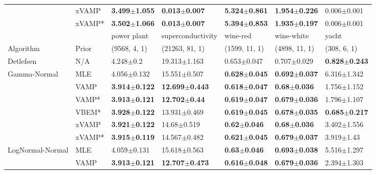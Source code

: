 \begin{tabular}{lllllll}
                 & xVAMP &  \textbf{3.499$\pm$1.055} &  \textbf{0.013$\pm$0.007} &  \textbf{5.324$\pm$0.861} &  \textbf{1.954$\pm$0.226} &         0.006$\pm$0.001 \\
                 & xVAMP* &  \textbf{3.502$\pm$1.066} &  \textbf{0.013$\pm$0.007} &  \textbf{5.394$\pm$0.853} &  \textbf{1.935$\pm$0.197} &         0.006$\pm$0.001 \\
\midrule
                 &        &               power plant &          superconductivity &                  wine-red &                wine-white &                     yacht \\
Algorithm & Prior& (9568, 4, 1)& (21263, 81, 1)& (1599, 11, 1)& (4898, 11, 1)& (308, 6, 1)\\
\midrule
Detlefsen & N/A &             4.248$\pm$0.2 &           19.313$\pm$1.163 &           0.653$\pm$0.047 &           0.707$\pm$0.029 &  \textbf{0.828$\pm$0.243} \\
Gamma-Normal & MLE &           4.056$\pm$0.132 &           15.551$\pm$0.507 &  \textbf{0.628$\pm$0.045} &  \textbf{0.692$\pm$0.037} &           6.316$\pm$1.342 \\
                 & VAMP &  \textbf{3.914$\pm$0.122} &  \textbf{12.699$\pm$0.443} &  \textbf{0.618$\pm$0.047} &   \textbf{0.68$\pm$0.036} &           1.756$\pm$1.152 \\
                 & VAMP* &  \textbf{3.913$\pm$0.121} &   \textbf{12.702$\pm$0.44} &  \textbf{0.619$\pm$0.047} &  \textbf{0.679$\pm$0.036} &           1.796$\pm$1.107 \\
                 & VBEM* &  \textbf{3.928$\pm$0.122} &           13.931$\pm$0.469 &  \textbf{0.619$\pm$0.045} &  \textbf{0.678$\pm$0.035} &  \textbf{0.685$\pm$0.217} \\
                 & xVAMP &  \textbf{3.921$\pm$0.122} &            14.68$\pm$0.519 &   \textbf{0.62$\pm$0.046} &   \textbf{0.68$\pm$0.036} &           3.402$\pm$1.556 \\
                 & xVAMP* &  \textbf{3.915$\pm$0.119} &           14.567$\pm$0.482 &  \textbf{0.621$\pm$0.045} &  \textbf{0.679$\pm$0.037} &            3.919$\pm$1.43 \\
LogNormal-Normal & MLE &           4.059$\pm$0.131 &           15.618$\pm$0.563 &   \textbf{0.63$\pm$0.046} &  \textbf{0.693$\pm$0.038} &           5.516$\pm$1.297 \\
                 & VAMP &  \textbf{3.913$\pm$0.121} &  \textbf{12.707$\pm$0.473} &  \textbf{0.616$\pm$0.048} &  \textbf{0.679$\pm$0.036} &           2.394$\pm$1.303 \\

\end{tabular}
